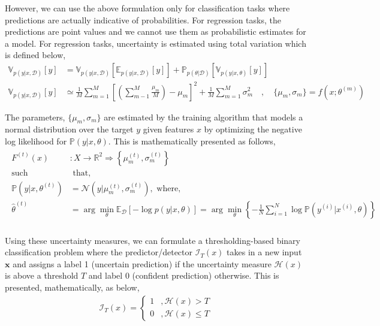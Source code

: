 \documentclass{article}
\begin{document}
However, we can use the above formulation only for classification tasks where predictions are actually indicative of probabilities. For regression tasks, the predictions are point values and we cannot use them as probabilistic estimates for a model. For regression tasks, uncertainty is estimated using total variation which is defined below,
\begin{align}
		\mathbb{V}_{p(y|x, \mathcal{D})}[y] &= \mathbb{V}_{p(y|x, \mathcal{D})}[\mathbb{E}_{p(y|x, \mathcal{D})}[y]] + \mathbb{P}_{p(\theta|\mathcal{D})}[\mathbb{V}_{p(y|x,\theta)}[y]] \\
		\mathbb{V}_{p(y|x, \mathcal{D})}[y] &\simeq \frac{1}{M} \sum\limits_{m=1}^M \left[ \left( \sum\limits_{m-1}^M \frac{\mu_m}{M} \right) - \mu_m \right]^2 + \frac{1}{M} \sum\limits_{m=1}^M \sigma_m^2 \quad , \quad \{ \mu_m, \sigma_m \} = f(x; \theta^{(m)})
\end{align}

The parameters, $\{ \mu_m , \sigma_m \}$ are estimated by the training algorithm that models a normal distribution over the target $y$ given features $x$ by optimizing the negative log likelihood for $\mathbb{P}(y|x, \theta)$. This is mathematically presented as follows,
\begin{align}
	\begin{split}
		F^{(t)}(x) &: X \to \mathbb{R}^2 \Rightarrow \left\{ \mu_m^{(t)},\sigma_m^{(t)} \right\} \\
		\text{such} &\text{ that, } \\
		\mathbb{P}(y|x,\theta^{(t)}) &= \mathcal{N}\left( y|\mu_m^{(t)},\sigma_m^{(t)} \right), \text{ where,} \\
		\hat{\theta}^{(t)} &= \arg \min_{\theta} \mathbb{E}_{\mathcal{D}}[-\log{p(y|x, \theta)}] =  \arg \min_{\theta} \left\{ - \frac{1}{N} \sum\limits_{i=1}^N \log{\mathbb{P}(y^{(i)}|x^{(i)},\theta)} \right\} \\
	\end{split}
\end{align}

Using these uncertainty measures, we can formulate a thresholding-based binary classification problem where the predictor/detector $\mathcal{I}_T(x)$ takes in a new input $\textbf{x}$ and assigns a label 1 (uncertain prediction) if the uncertainty measure $\mathcal{H}(x)$ is above a threshold $T$ and label 0 (confident prediction) otherwise. This is presented, mathematically, as below,
\begin{align}
	\mathcal{I}_T(x) = 	\left\{
		\begin{array}{ll}
			1  & ,\mathcal{H}(x) > T\\
			0  & ,\mathcal{H}(x) \le T 
		\end{array}
	\right.
\end{align}
\end{document}
